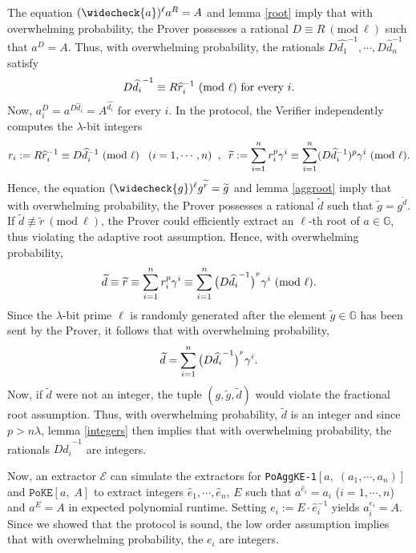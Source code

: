\documentclass[11pt, lettersize, notitlepage, leqno, footskip=0.6cm]{article}
\newcommand{\slim}{\sum\limits}
\newcommand{\ttt}{\texttt}
\newcommand{\bG}{\mathbb{G}}
\newcommand{\wti}{\widetilde}
\newcommand{\mc}{\mathcal}
\newcommand{\lam}{\lambda}
\newcommand{\what}{\widehat}
\newcommand{\weck}{\widecheck}
\newcommand{\vs}{\vspace{-0.15cm}}
\newcommand{\op}{overwhelming probability}
\newcommand{\Mod}[1]{\ (\mathrm{mod}\ #1)}
\newcommand{\E}{\mc{E}}
\numberwithin{equation}{section}
\begin{document}
\begin{prf}
The equation $(\weck{a})^{\ell}a^R= A$ and lemma \ref{root} imply that with \op, the Prover possesses a rational $D\equiv R\Mod{\ell}$ such that $a^D = A$. Thus, with \op, the rationals $D\what{d_1}^{-1},\cdots,D\what{d}_n^{-1}$ satisfy \vs $$D\what{d_i}^{-1}\equiv R\what{r}_i^{-1}\Mod{\ell} \text{ for every }i. \vs $$ Now, $a_i^{D} = a^{D\what{d}_i} = A^{\what{d_i}} \text{ for every }i.$ In the protocol, the Verifier independently computes the $\lam$-bit integers \vs $$r_i:= R\what{r}_{i}^{-1}\equiv D\what{d}_i^{-1}\Mod{\ell}\;\;\;(i=1,\cdots,n)\;\;,\;\;\wti{r}:= {\slim_{i=1}^n r_i^{p}\gamma^i}\equiv {\slim_{i=1}^n (D\what{d}_i^{-1})^{p}\gamma^i}\Mod{\ell}. \vs $$ Hence, the equation $(\weck{g})^{\ell}g^{\wti{r}} = \wti{g}$ and lemma \ref{aggroot} imply that with \op, the Prover possesses a rational $\wti{d}$ such that $\wti{g} = g^{\wti{d}}$. If $\wti{d}\not\equiv\wti{r}\Mod{\ell}$, the Prover could efficiently extract an $\ell$-th root of $a\in\bG$, thus violating the adaptive root assumption. Hence, with \op, \vs $$\wti{d}\equiv \wti{r}\equiv \slim_{i=1}^n r_i^{{p}}\gamma^i \equiv   \slim_{i=1}^n \big(D\what{d_i}^{-1}\big)^{^{p}}\gamma^i \Mod{\ell}. \vs $$ Since the $\lam$-bit prime $\ell$ is randomly generated after the element $\wti{g}\in\bG$ has been sent by the Prover, it follows that with \op, \vs $$\wti{d} = \slim_{i=1}^n \big(D\what{d_i}^{-1}\big)^{^{p}}\gamma^i. \vs $$ Now, if $\wti{d}$ were not an integer, the tuple $(g, \wti{g}, \wti{d})$ would violate the fractional root assumption. Thus, with \op, $\wti{d}$ is an integer and since $p > n\lam$, lemma \ref{integers} then implies that with \op, the rationals $D\what{d_i}^{-1}$ are integers.

Now, an extractor $\E$ can simulate the extractors for \verb|PoAggKE-1|$[a,\;(a_1,\cdots,a_n)]$ and $\ttt{PoKE}[a,\; A]$ to extract integers $\what{e}_1,\cdots, \what{e}_n$, $E$ such that $a^{\what{e}_i} = a_i$ ($i=1,\cdots,n$) and $a^E = A$ in expected polynomial runtime. Setting $e_i:= E\cdot\what{e}_i^{-1}$ yields $a_i^{e_i} = A$. Since we showed that the protocol is sound, the low order assumption implies that with \op, the $e_i$ are integers.\end{prf}

\end{document}
